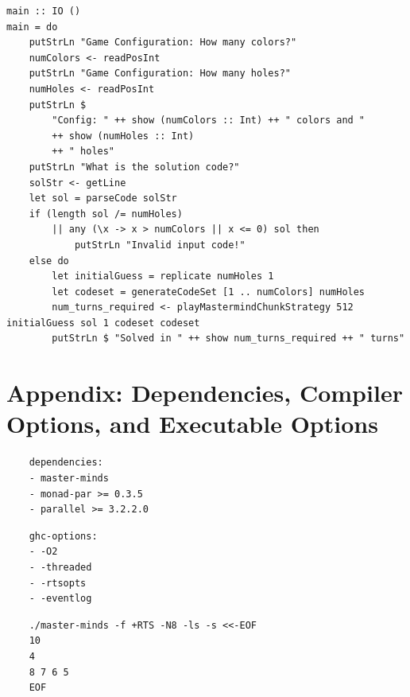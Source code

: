\documentclass{article}
\begin{document}
\begin{verbatim}
main :: IO ()
main = do
    putStrLn "Game Configuration: How many colors?"
    numColors <- readPosInt
    putStrLn "Game Configuration: How many holes?"
    numHoles <- readPosInt
    putStrLn $
        "Config: " ++ show (numColors :: Int) ++ " colors and "
        ++ show (numHoles :: Int)
        ++ " holes"
    putStrLn "What is the solution code?"
    solStr <- getLine
    let sol = parseCode solStr
    if (length sol /= numHoles)
        || any (\x -> x > numColors || x <= 0) sol then
            putStrLn "Invalid input code!"
    else do
        let initialGuess = replicate numHoles 1 
        let codeset = generateCodeSet [1 .. numColors] numHoles
        num_turns_required <- playMastermindChunkStrategy 512 initialGuess sol 1 codeset codeset
        putStrLn $ "Solved in " ++ show num_turns_required ++ " turns"
\end{verbatim}

\section{Appendix: Dependencies, Compiler Options, and Executable Options}
\begin{verbatim}
    dependencies: 
    - master-minds
    - monad-par >= 0.3.5
    - parallel >= 3.2.2.0
\end{verbatim}

\begin{verbatim}
    ghc-options:
    - -O2
    - -threaded
    - -rtsopts
    - -eventlog
\end{verbatim}

\begin{verbatim}
    ./master-minds -f +RTS -N8 -ls -s <<-EOF
    10
    4
    8 7 6 5
    EOF
\end{verbatim}
\end{document}
